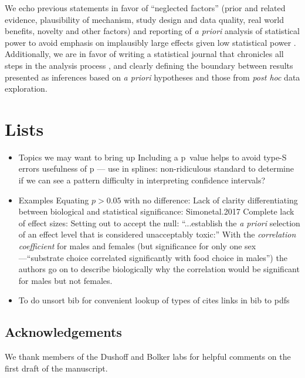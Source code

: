 We echo previous statements in favor of ``neglected factors'' (prior and related evidence, plausibility of mechanism, 
study design and data quality, real world benefits, novelty and other factors) \citep{McShaneetal.2017} and 
reporting of \emph{a priori} analysis of statistical power to avoid emphasis on implausibly large effects given low 
statistical power \citep[the "winners curse"][]{GelmanandCarlin2014, SzucsandIoannidis2017, Bernardietal.2017}. 
Additionally, we are in favor of writing a statistical journal that chronicles all steps in the analysis process 
\citep{Kassetal.2016}, and clearly defining the boundary between results presented as inferences based on \emph{a priori}
hypotheses and those from \emph{post hoc} data exploration. 

\section*{Lists}

\begin{itemize}
  \item Topics we may want to bring up
	  \subitem Including a p~value helps to avoid type-S errors
      \subitem usefulness of p --- use in splines: non-ridiculous standard to determine if we can see a pattern
      \subitem difficulty in interpreting confidence intervals?
\end{itemize}

\begin{itemize}
  \item Examples
  \subitem Equating $p > 0.05$ with no difference: \citep{Ortegoetal.2007, Bukovinszkyetal.2017, Singhetal.2017, Sundinetal.2017}
  \subitem Lack of clarity differentiating between biological and statistical significance: {Simonetal.2017}
  \subitem Complete lack of effect sizes: \citep{Juriadoetal.2017}
  \subitem Setting out to accept the null: \citep{Karulinetal.2015}
  \subitem ``...establish the \emph{a priori} selection of an effect level that is considered unacceptably toxic:'' \citep{Dentonetal.2011}
  \subitem With the \emph{correlation coefficient} for males and females (but significance for only one sex---``substrate 
  choice correlated significantly with food choice in males'') the authors go on to describe biologically why the 
  correlation would be significant for males but not females. \citep{MerilaitaandJormalainen1997}
\end{itemize}

\begin{itemize}
  \item To do
  	\subitem unsort bib for convenient lookup of types of cites
    \subitem links in bib to pdfs
\end{itemize}

\subsection*{Acknowledgements}

We thank members of the Dushoff and Bolker labs for helpful comments on the first draft of the manuscript.  

